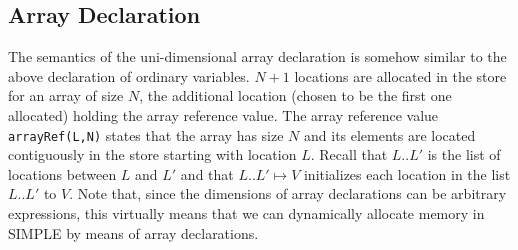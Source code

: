 \documentclass{article}
\begin{document}
\begin{kdefinition}
\begin{module}{}
\begin{syntaxBlock}{}
\end{syntaxBlock}
\begin{kblock}[text]
 \subsection{Array Declaration}
The \K semantics of the uni-dimensional array declaration is somehow similar
to the above declaration of ordinary variables.  $N+1$ locations are allocated
in the store for an array of size $N$, the additional location (chosen to be
the first one allocated) holding the array reference value.  The array
reference value \texttt{arrayRef(L,N)} states that the array has size
$N$ and its elements are located contiguously in the store starting
with location $L$.  Recall that $L..L'$ is the list of locations
between $L$ and $L'$ and that $L..L'\mapsto V$ initializes each
location in the list $L..L'$ to $V$.  Note that, since the dimensions
of array declarations can be arbitrary expressions, this virtually
means that we can dynamically allocate memory in SIMPLE by means of
array declarations. \end{kblock}
\begin{kblock}[text]

\end{kblock}
\end{module}
\end{kdefinition}
\end{document}
